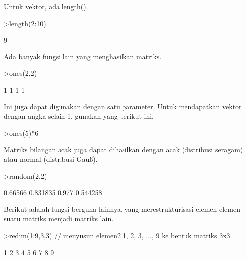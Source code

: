 \documentclass[a4paper,10pt]{article}
\begin{document}
\begin{eulernotebook}
\begin{eulercomment}
\begin{eulercomment}
\begin{eulercomment}
\begin{eulercomment}
\begin{eulercomment}
\begin{eulercomment}
\begin{eulercomment}
Untuk vektor, ada length().
\end{eulercomment}
\begin{eulerprompt}
>length(2:10)
\end{eulerprompt}
\begin{euleroutput}
  9
\end{euleroutput}
\begin{eulercomment}
Ada banyak fungsi lain yang menghasilkan matriks.
\end{eulercomment}
\begin{eulerprompt}
>ones(2,2)
\end{eulerprompt}
\begin{euleroutput}
              1             1 
              1             1 
\end{euleroutput}
\begin{eulercomment}
Ini juga dapat digunakan dengan satu parameter. Untuk mendapatkan
vektor dengan angka selain 1, gunakan yang berikut ini.
\end{eulercomment}
\begin{eulerprompt}
>ones(5)*6
\end{eulerprompt}
\begin{euleroutput}
  [6,  6,  6,  6,  6]
\end{euleroutput}
\begin{eulercomment}
Matriks bilangan acak juga dapat dihasilkan dengan acak (distribusi
seragam) atau normal (distribusi Gauß).
\end{eulercomment}
\begin{eulerprompt}
>random(2,2)
\end{eulerprompt}
\begin{euleroutput}
        0.66566      0.831835 
          0.977      0.544258 
\end{euleroutput}
\begin{eulercomment}
Berikut adalah fungsi berguna lainnya, yang merestrukturisasi
elemen-elemen suatu matriks menjadi matriks lain.
\end{eulercomment}
\begin{eulerprompt}
>redim(1:9,3,3) // menyusun elemen2 1, 2, 3, ..., 9 ke bentuk matriks 3x3
\end{eulerprompt}
\begin{euleroutput}
              1             2             3 
              4             5             6 
              7             8             9 
\end{euleroutput}
\begin{eulercomment}

\end{eulercomment}
\end{eulercomment}
\end{eulercomment}
\end{eulercomment}
\end{eulercomment}
\end{eulercomment}
\end{eulercomment}
\end{eulernotebook}
\end{document}
